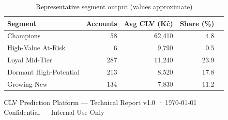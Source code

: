 \documentclass[11pt,a4paper]{article}
\begin{document}
\begin{table}[H]
\centering\small
\begin{tabular}{lrrrr}
\toprule
\textbf{Segment} & \textbf{Accounts} & \textbf{Avg CLV (Kč)} & \textbf{Share (\%)} \\
\midrule
Champions              & 58  & 62{,}410 & 4.8 \\
High-Value At-Risk     & 6   & 9{,}790  & 0.5 \\
Loyal Mid-Tier         & 287 & 11{,}240 & 23.9 \\
Dormant High-Potential & 213 & 8{,}520  & 17.8 \\
Growing New            & 134 & 7{,}830  & 11.2 \\
\bottomrule
\end{tabular}
\caption{Representative segment output (values approximate)}
\end{table}

\vfill
\begin{center}
  \color{sfgray}\small
  CLV Prediction Platform — Technical Report v1.0 · \today \\
  Confidential — Internal Use Only
\end{center}
\end{document}
